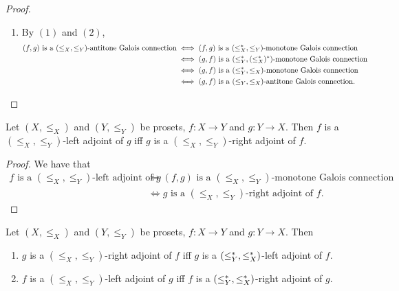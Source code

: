 \documentclass{book}
\begin{document}
\begin{proof}
\begin{enumerate}
\begin{itemize}
				Suppose that $(f,g)$ is a $(\lop_X, \leq_Y)$-monotone Galois connection. Let $x \in X$ and $y \in Y$. Then by assumption, 
				\begin{align*}
					f(x) \leq_Y y
					& \iff x \lop_X g(y) \\
					& \iff g(y) \leq_X x.
				\end{align*}
				Since $x \in X$ and $y \in Y$ are arbitrary, we have that for each $x \in X$ and $y \in Y$, $f(x) \leq_Y y$ iff $g(y) \leq_X x$. Therefore $(f,g)$ is a $(\leq_X, \leq_Y)$-antitone Galois connection.
			\end{itemize}
			\item By $(1)$ and $(2)$, 
			\begin{align*}
				\text{$(f,g)$ is a $(\leq_X, \leq_Y)$-antitone Galois connection}
				& \iff \text{$(f,g)$ is a $(\leq^*_X, \leq_Y)$-monotone Galois connection} \\
				& \iff \text{$(g,f)$ is a $(\leq^*_Y, (\leq^*_X)^*)$-monotone Galois connection} \\
				& \iff \text{$(g,f)$ is a $(\leq^*_Y, \leq_X)$-monotone Galois connection} \\
				& \iff \text{$(g,f)$ is a $(\leq_Y, \leq_X)$-antitone Galois connection}. 
			\end{align*}
		\end{enumerate}
	\end{proof}
	
	\begin{ex} 
		Let $(X, \leq_X)$ and $(Y, \leq_Y)$ be prosets, $f: X \rightarrow Y$ and $g:Y \rightarrow X$. Then $f$ is a $(\leq_X, \leq_Y)$-left adjoint of $g$ iff $g$ is a $(\leq_X, \leq_Y)$-right adjoint of $f$.
	\end{ex}
	
	\begin{proof}
		We have that 
		\begin{align*}
			\text{$f$ is a $(\leq_X, \leq_Y)$-left adjoint of $g$} 
			& \iff \text{$(f,g)$ is a $(\leq_X, \leq_Y)$-monotone Galois connection} \\
			& \iff \text{$g$ is a $(\leq_X, \leq_Y)$-right adjoint of $f$}.
		\end{align*}
	\end{proof}
	
	\begin{ex} 
		Let $(X, \leq_X)$ and $(Y, \leq_Y)$ be prosets, $f: X \rightarrow Y$ and $g:Y \rightarrow X$. Then 
		\begin{enumerate}
			\item $g$ is a $(\leq_X, \leq_Y)$-right adjoint of $f$ iff $g$ is a $(\leq^*_Y, \leq^*_X)$-left adjoint of $f$.
			\item $f$ is a $(\leq_X, \leq_Y)$-left adjoint of $g$ iff $f$ is a $(\leq^*_Y, \leq^*_X)$-right adjoint of $g$.
		\end{enumerate}
	\end{ex}
	
\end{document}
